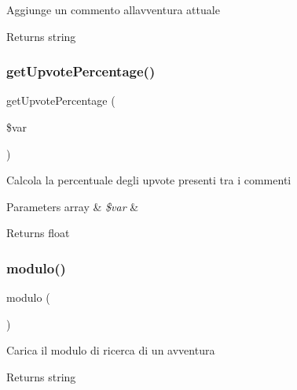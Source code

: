 Aggiunge un commento all\textquotesingle{}avventura attuale

\begin{DoxyReturn}{Returns}
string 
\end{DoxyReturn}
\mbox{\label{class_c_ricerca_a10b8a67c58f8c91b47c1ece8959754be}} 
\subsubsection{\texorpdfstring{get\+Upvote\+Percentage()}{getUpvotePercentage()}}
{\footnotesize\ttfamily get\+Upvote\+Percentage (\begin{DoxyParamCaption}\item[{}]{\$var }\end{DoxyParamCaption})}

Calcola la percentuale degli upvote presenti tra i commenti


\begin{DoxyParams}[1]{Parameters}
array & {\em \$var} & \\
\hline
\end{DoxyParams}
\begin{DoxyReturn}{Returns}
float 
\end{DoxyReturn}
\mbox{\label{class_c_ricerca_ae049a865cd77c4182dd44281b313b545}} 
\subsubsection{\texorpdfstring{modulo()}{modulo()}}
{\footnotesize\ttfamily modulo (\begin{DoxyParamCaption}{ }\end{DoxyParamCaption})}

Carica il modulo di ricerca di un avventura

\begin{DoxyReturn}{Returns}
string 
\end{DoxyReturn}
\mbox{\label{class_c_ricerca_a1882c9da84dc67772d89caa949280531}} 

